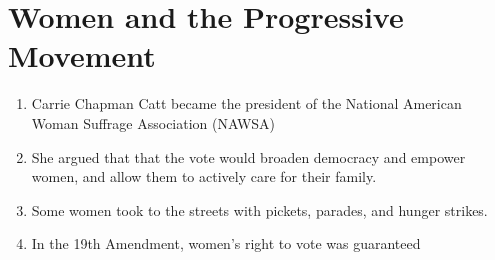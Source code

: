 \documentclass[12pt]{article} %
\begin{document}
\section{Women and the Progressive Movement}
\begin{enumerate}
	\item Carrie Chapman Catt became the president of the National American Woman Suffrage 
		Association (NAWSA)
	\item She argued that that the vote would broaden democracy and empower women, and allow them to
		actively care for their family.
	\item Some women took to the streets with pickets, parades, and hunger strikes.
	\item In the 19th Amendment, women's right to vote was guaranteed 
\end{enumerate}
\end{document}
